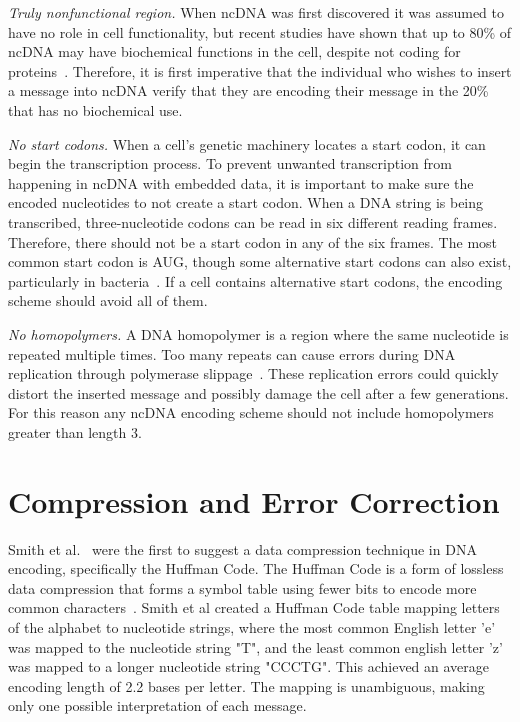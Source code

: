 \documentclass[USenglish,oneside,twocolumn]{article}
\begin{document}
\textit{Truly nonfunctional region.} When ncDNA was first discovered it was assumed to have no role in cell functionality, but recent studies have shown that up to 80\% of ncDNA may have biochemical functions in the cell, despite not coding for proteins~\cite{EPC2012N}. Therefore, it is first imperative that the individual who wishes to insert a message into ncDNA verify that they are encoding their message in the 20\% that has no biochemical use.

\textit{No start codons.} When a cell's genetic machinery locates a start codon, it can begin the transcription process. To prevent unwanted transcription from happening in ncDNA with embedded data, it is important to make sure the encoded nucleotides to not create a start codon. When a DNA string is being transcribed, three-nucleotide codons can be read in six different reading frames. Therefore, there should not be a start codon in any of the six frames. The most common start codon is AUG, though some alternative start codons can also exist, particularly in bacteria~\cite{B1997S}. If a cell contains alternative start codons, the encoding scheme should avoid all of them.

\textit{No homopolymers.} A DNA homopolymer is a region where the same nucleotide is repeated multiple times. Too many repeats can cause errors during DNA replication through polymerase slippage~\cite{VCE2001TEJ}. These replication errors could quickly distort the inserted message and possibly damage the cell after a few generations. For this reason any ncDNA encoding scheme should not include homopolymers greater than length 3.

\section{Compression and Error Correction}

Smith et al.~\cite{SFHC2003BL} were the first to suggest a data compression technique in DNA encoding, specifically the Huffman Code. The Huffman Code is a form of lossless data compression that forms a symbol table using fewer bits to encode more common characters~\cite{H1952POTIRE}. Smith et al created a Huffman Code table mapping letters of the alphabet to nucleotide strings, where the most common English letter 'e' was mapped to the nucleotide string "T", and the least common english letter 'z' was mapped to a longer nucleotide string "CCCTG". This achieved an average encoding length of 2.2 bases per letter. The mapping is unambiguous, making only one possible interpretation of each message.
\end{document}
